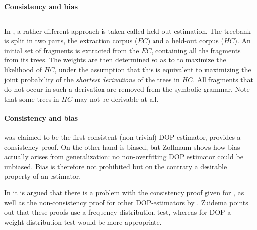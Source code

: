 \paragraph{Consistency and bias}

\subsection{\dops}
In \dops{} \cite{zollmann2005}, a rather different approach is taken called held-out estimation. The treebank is split in two parts, the extraction corpus ($EC$) and a held-out corpus ($HC$). An initial set of fragments is extracted from the $EC$, containing all the fragments from its trees. The weights are then determined so as to to maximize the likelihood of $HC$, under the assumption that this is equivalent to maximizing the joint probability of the \emph{shortest derivations} of the trees in $HC$. All fragments that do not occur in such a derivation are removed from the symbolic grammar. Note that some trees in $HC$ may not be derivable at all. 

\paragraph{Consistency and bias}
\dops{} was claimed to be the first consistent (non-trivial) DOP-estimator, \cite{zollmann2005} provides a consistency proof. On the other hand \dops{} is  biased, but Zollmann shows how bias actually arises from generalization: no non-overfitting DOP estimator could be unbiased. Bias is therefore not prohibited but on the contrary a desirable property of an estimator.

In \cite{zuidema2006} it is argued that there is a problem with the consistency proof given for \dops{}, as well as the non-consistency proof for other DOP-estimators by \cite{johnson2002}. Zuidema points out that these proofs use a frequency-distribution test, whereas for DOP a weight-distribution test would be more appropriate. 

